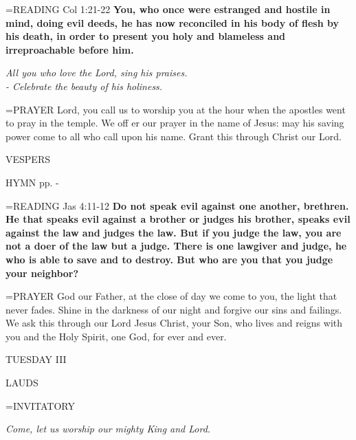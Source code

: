 \hangindent=\parindent \small{READING} Col 1:21-22 \textbf{You, who once were estranged and hostile in mind, doing evil deeds, he has now reconciled in his body of flesh by his death, in order to present you holy and blameless and irreproachable before him.}

\begin{center}
\textit{All you who love the Lord, sing his praises.\\
- Celebrate the beauty of his holiness.}
\end{center}

\hangindent=\parindent \small{PRAYER  Lord, you call us to worship you at the hour when the apostles went to pray in the temple. We off er our prayer in the name of Jesus: may his saving power come to all who call upon his name. Grant this through Christ our Lord.}

\begin{flushleft}\normalsize VESPERS\\\end{flushleft}
HYMN pp. \pageref{ordinaryTime:fourthHymn} - \pageref{ordinaryTime:sixthHymn}

\hangindent=\parindent \small{READING} Jas 4:11-12 \textbf{Do not speak evil against one another, brethren.  He that speaks evil against a brother or judges his brother, speaks evil against the law and judges the law. But if you judge the law, you are not a doer of the law but a judge. There is one lawgiver and judge, he who is able to save and to destroy. But who are you that you judge your neighbor?\\}

\hangindent=\parindent \small{PRAYER  God our Father, at the close of day we come to you, the light that never fades. Shine in the darkness of our night and forgive our sins and failings. We ask this through our Lord Jesus Christ, your Son, who lives and reigns with you and the Holy Spirit, one God, for ever and ever.}

\begin{center}
\normalsize TUESDAY III
\end{center}

\begin{flushleft}\normalsize LAUDS\\\end{flushleft}

\hangindent=\parindent \small{INVITATORY}
\begin{center}
\textit{Come, let us worship our mighty King and Lord.\\}
\end{center}

